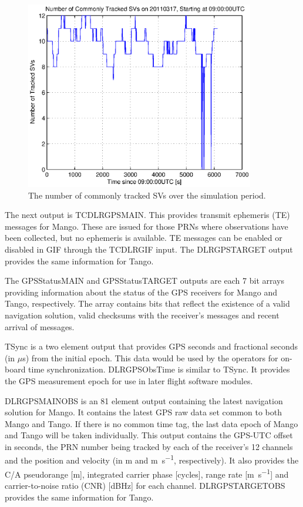 \documentclass{article}
\begin{document}
\begin{figure}[H]
    \centering
    \includegraphics[width=10cm]{commonSVs.eps}
    \caption{The number of commonly tracked SVs over the simulation period.}
    \label{fig:common}
\end{figure}


The next output is TC\textunderscore DLR\textunderscore GPS\textunderscore MAIN. This provides transmit ephemeris (TE) messages for Mango. These are issued for those PRNs where observations have been collected, but no ephemeris is available. TE messages can be enabled or disabled in GIF through the TC\textunderscore DLR\textunderscore GIF input. The DLR\textunderscore GPS\textunderscore TARGET output provides the same information for Tango. 

The GPS\textunderscore Status\textunderscore MAIN and GPS\textunderscore Status\textunderscore TARGET outputs are each 7 bit arrays providing information about the status of the GPS receivers for Mango and Tango, respectively. The array contains bits that reflect the existence of a valid navigation solution, valid checksums with the receiver's messages and recent arrival of messages.

TSync is a two element output that provides GPS seconds and fractional seconds (in $\mu$s) from the initial epoch. This data would be used by the operators for on-board time synchronization. DLR\textunderscore GPS\textunderscore Obs\textunderscore Time is similar to TSync. It provides the GPS measurement epoch for use in later flight software modules.

DLR\textunderscore GPS\textunderscore MAIN\textunderscore OBS is an 81 element output containing the latest navigation solution for Mango. It contains the latest GPS raw data set common to both Mango and Tango. If there is no common time tag, the last data epoch of Mango and Tango will be taken individually. This output contains the GPS-UTC offset in seconds, the PRN number being tracked by each of the receiver's 12 channels and the position and velocity (in \si{\meter} and \si{\meter\per\second}, respectively). It also provides the C/A pseudorange [\si{\meter}], integrated carrier phase [\si{cycles}], range rate [\si{\meter\per\second}] and carrier-to-noise ratio (CNR) [\si{dBHz}] for each channel. DLR\textunderscore GPS\textunderscore TARGET\textunderscore OBS provides the same information for Tango. 
\end{document}
